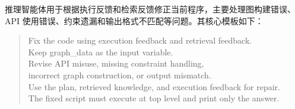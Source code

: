 推理智能体用于根据执行反馈和检索反馈修正当前程序，主要处理图构建错误、API 使用错误、约束遗漏和输出格式不匹配等问题。其核心模板如下：

\begin{quote}
\small
\ttfamily
Fix the code using execution feedback and retrieval feedback.\\
Keep graph\_data as the input variable.\\
Revise API misuse, missing constraint handling,\\
incorrect graph construction, or output mismatch.\\
Use the plan, retrieved knowledge, and execution feedback for repair.\\
The fixed script must execute at top level and print only the answer.
\end{quote}
